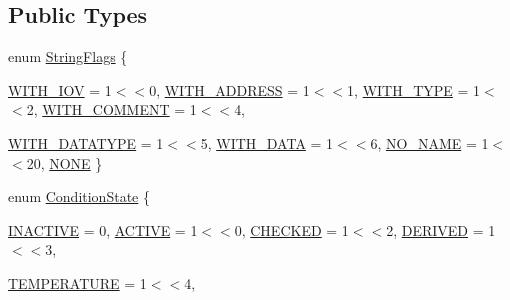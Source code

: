 \subsection*{Public Types}
\begin{DoxyCompactItemize}
\item 
enum \hyperlink{class_d_d4hep_1_1_conditions_1_1_condition_a6d54644b9e4e9d550a10707e72e5b298}{StringFlags} \{ \par
\hyperlink{class_d_d4hep_1_1_conditions_1_1_condition_a6d54644b9e4e9d550a10707e72e5b298a407e2b00d51258e13d82e8632f62746b}{WITH\_\-IOV} =  1$<$$<$0, 
\hyperlink{class_d_d4hep_1_1_conditions_1_1_condition_a6d54644b9e4e9d550a10707e72e5b298a4a0769943c197cfba347ebc1397a2ee7}{WITH\_\-ADDRESS} =  1$<$$<$1, 
\hyperlink{class_d_d4hep_1_1_conditions_1_1_condition_a6d54644b9e4e9d550a10707e72e5b298a14e827a81942c00e5a4db449e434225e}{WITH\_\-TYPE} =  1$<$$<$2, 
\hyperlink{class_d_d4hep_1_1_conditions_1_1_condition_a6d54644b9e4e9d550a10707e72e5b298a3d197a913c287e610e4620cc80ba46d7}{WITH\_\-COMMENT} =  1$<$$<$4, 
\par
\hyperlink{class_d_d4hep_1_1_conditions_1_1_condition_a6d54644b9e4e9d550a10707e72e5b298a1f2afb3299a66acc0b45e2e098053253}{WITH\_\-DATATYPE} =  1$<$$<$5, 
\hyperlink{class_d_d4hep_1_1_conditions_1_1_condition_a6d54644b9e4e9d550a10707e72e5b298a35bae13c963ac6e110acfd8e11a2f054}{WITH\_\-DATA} =  1$<$$<$6, 
\hyperlink{class_d_d4hep_1_1_conditions_1_1_condition_a6d54644b9e4e9d550a10707e72e5b298a09fe0228207ad624d583479a9c7c10d1}{NO\_\-NAME} =  1$<$$<$20, 
\hyperlink{class_d_d4hep_1_1_conditions_1_1_condition_a6d54644b9e4e9d550a10707e72e5b298a9a77df7c1176110f0e42e09fe834cc6a}{NONE}
 \}
\item 
enum \hyperlink{class_d_d4hep_1_1_conditions_1_1_condition_a22825c02029e39fd0aa95c08c9be56d9}{ConditionState} \{ \par
\hyperlink{class_d_d4hep_1_1_conditions_1_1_condition_a22825c02029e39fd0aa95c08c9be56d9a5dc589abb882dce294a5c4232fe381a7}{INACTIVE} =  0, 
\hyperlink{class_d_d4hep_1_1_conditions_1_1_condition_a22825c02029e39fd0aa95c08c9be56d9a6a6c6f47c2bd5105363d432f8e55fcfa}{ACTIVE} =  1$<$$<$0, 
\hyperlink{class_d_d4hep_1_1_conditions_1_1_condition_a22825c02029e39fd0aa95c08c9be56d9aaecadd3a86731c33c98552cb8b5da1dc}{CHECKED} =  1$<$$<$2, 
\hyperlink{class_d_d4hep_1_1_conditions_1_1_condition_a22825c02029e39fd0aa95c08c9be56d9a81168be4049b53d9debe98ba4a1e1001}{DERIVED} =  1$<$$<$3, 
\par
\hyperlink{class_d_d4hep_1_1_conditions_1_1_condition_a22825c02029e39fd0aa95c08c9be56d9a2473120270dacdf59c4d2ad3e2448b5e}{TEMPERATURE} =  1$<$$<$4, 
$$
\end{DoxyCompactItemize}
